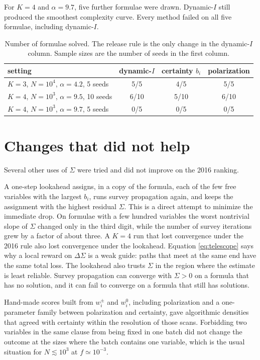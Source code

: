 \documentclass[11pt]{article}
\begin{document}
For $K=4$ and $\alpha=9.7$, five further formulae were drawn. Dynamic-$I$ still produced the smoothest complexity curve. Every method failed on all five formulae, including dynamic-$I$.

\begin{table}[ht]
\centering
\begin{tabular}{lccc}
\hline
setting & dynamic-$I$ & certainty $b_i$ & polarization \\
\hline
$K=3$, $N=10^4$, $\alpha=4.2$, 5 seeds & 5/5 & 4/5 & 5/5 \\
$K=4$, $N=10^3$, $\alpha=9.5$, 10 seeds & 6/10 & 5/10 & 6/10 \\
$K=4$, $N=10^3$, $\alpha=9.7$, 5 seeds & 0/5 & 0/5 & 0/5 \\
\hline
\end{tabular}
\caption{Number of formulae solved. The release rule is the only change in the dynamic-$I$ column. Sample sizes are the number of seeds in the first column.}
\end{table}

\section{Changes that did not help}

Several other uses of $\Sigma$ were tried and did not improve on the 2016 ranking.

A one-step lookahead assigns, in a copy of the formula, each of the few free variables with the largest $b_i$, runs survey propagation again, and keeps the assignment with the highest residual $\Sigma$. This is a direct attempt to minimize the immediate drop. On formulae with a few hundred variables the worst nontrivial slope of $\Sigma$ changed only in the third digit, while the number of survey iterations grew by a factor of about three. A $K=4$ run that lost convergence under the 2016 rule also lost convergence under the lookahead. Equation \eqref{eq:telescope} says why a local reward on $\Delta\Sigma$ is a weak guide: paths that meet at the same end have the same total loss. The lookahead also trusts $\Sigma$ in the region where the estimate is least reliable. Survey propagation can converge with $\Sigma>0$ on a formula that has no solution, and it can fail to converge on a formula that still has solutions.

Hand-made scores built from $w^{\pm}_i$ and $w^0_i$, including polarization and a one-parameter family between polarization and certainty, gave algorithmic densities that agreed with certainty within the resolution of those scans. Forbidding two variables in the same clause from being fixed in one batch did not change the outcome at the sizes where the batch contains one variable, which is the usual situation for $N\lesssim 10^3$ at $f\simeq 10^{-3}$.
\end{document}
